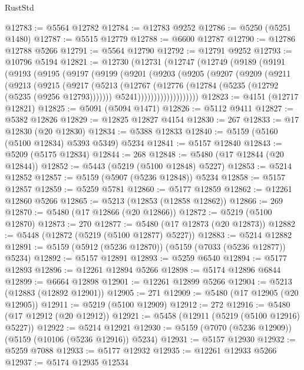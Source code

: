 \begin{lexlean}{RustStd}
\begin{coremodule}
@12783 := @5564 @12782
@12784 := @12783 @9252
@12786 := @5250 (@5251 @1480)
@12787 := @5515 @12779
@12788 := @6600 @12787
@12790 := @12786 @12788 @5266
@12791 := @5564 @12790
@12792 := @12791 @9252
@12793 := @10796 @5194
@12821 := @12730
    (@12731
      (@12747
        (@12749
          (@9189
            (@9191
              (@9193
                (@9195
                  (@9197
                    (@9199
                      (@9201
                        (@9203
                          (@9205
                            (@9207
                              (@9209
                                (@9211
                                  (@9213
                                    (@9215
                                      (@9217
                                        (@5213
                                          (@12767
                                            (@12776
                                              (@12784 (@5235 (@12792 (@5235 (@9256 @12793)))))))
                                          @5241)))))))))))))))))))
@12823 := @4151 (@12717 @12821)
@12825 := @5091 (@5094 @1471)
@12826 := @5112 @9411
@12827 := @5382 @12826
@12829 := @12825 @12827 @4154
@12830 := 267
@12833 := @17 @12830 (@20 @12830)
@12834 := @5388 @12833
@12840 := @5159 (@5160 (@5100 @12834) @5393 @5349) @5234
@12841 := @5157 @12840
@12843 := @5209 (@5175 @12834)
@12844 := 268
@12848 := @5480 (@17 @12844 (@20 @12844))
@12852 := @5443 (@5219 (@5100 @12848) @5227)
@12853 := @5214 @12852
@12857 := @5159 (@5907 (@5236 @12848)) @5234
@12858 := @5157 @12857
@12859 := @5259 @5781
@12860 := @5177 @12859
@12862 := @12261 @12860 @5266
@12865 := @5213 (@12853 (@12858 @12862))
@12866 := 269
@12870 := @5480 (@17 @12866 (@20 @12866))
@12872 := @5219 (@5100 @12870)
@12873 := 270
@12877 := @5480 (@17 @12873 (@20 @12873))
@12882 := @5448 (@12872 (@5219 (@5100 @12877) @5227))
@12883 := @5214 @12882
@12891 := @5159 (@5912 (@5236 @12870)) (@5159 (@7033 (@5236 @12877)) @5234)
@12892 := @5157 @12891
@12893 := @5259 @6540
@12894 := @5177 @12893
@12896 := @12261 @12894 @5266
@12898 := @5174 @12896 @6844
@12899 := @6664 @12898
@12901 := @12261 @12899 @5266
@12904 := @5213 (@12883 (@12892 @12901))
@12905 := 271
@12909 := @5480 (@17 @12905 (@20 @12905))
@12911 := @5219 (@5100 @12909)
@12912 := 272
@12916 := @5480 (@17 @12912 (@20 @12912))
@12921 := @5458 (@12911 (@5219 (@5100 @12916) @5227))
@12922 := @5214 @12921
@12930 := @5159 (@7070 (@5236 @12909)) (@5159 (@10106 (@5236 @12916)) @5234)
@12931 := @5157 @12930
@12932 := @5259 @7088
@12933 := @5177 @12932
@12935 := @12261 @12933 @5266
@12937 := @5174 @12935 @12534

\end{coremodule}
\end{lexlean}
